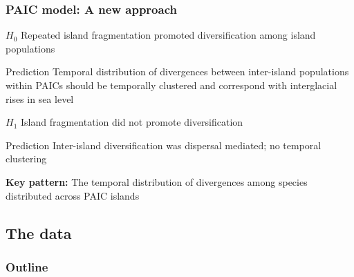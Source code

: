 \begin{frame}
    \frametitle{PAIC model: A new approach}
            \begin{mydescription}
                \item[$H_0$] Repeated island fragmentation promoted diversification
                    among island populations
                    \begin{mydescription}
                        \item[Prediction] Temporal distribution of divergences
                            between inter-island populations within PAICs
                            should be temporally clustered and correspond with
                            interglacial rises in sea level
                    \end{mydescription}
                \item[$H_1$] Island fragmentation did not promote diversification
                    \begin{mydescription}
                        \item[Prediction] Inter-island diversification was
                            dispersal mediated; no temporal clustering
                    \end{mydescription}
            \end{mydescription}
            
            {\bf Key pattern:} The temporal distribution of divergences
                    among species distributed across PAIC islands
\end{frame}

\subsection{The data}

\begin{frame}
\frametitle{Outline}
\end{frame}

